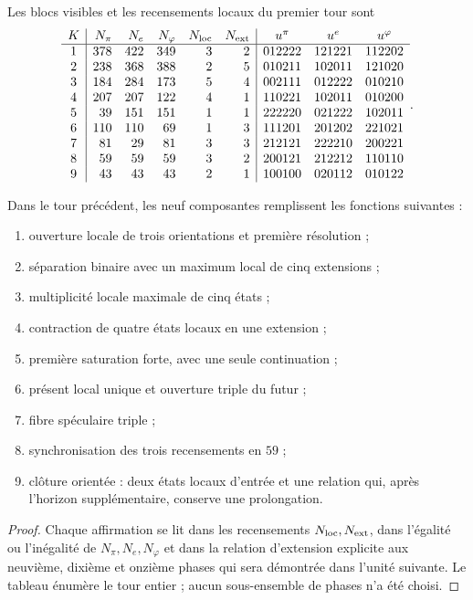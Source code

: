 Les blocs visibles et les recensements locaux du premier tour sont
\[
\begin{array}{c|rrrrr|ccc}
K&N_\pi&N_e&N_\varphi&N_{\rm loc}&N_{\rm ext}
 &u^\pi&u^e&u^\varphi\\\hline
1&378&422&349&3&2&012222&121221&112202\\
2&238&368&388&2&5&010211&102011&121020\\
3&184&284&173&5&4&002111&012222&010210\\
4&207&207&122&4&1&110221&102011&010200\\
5&39&151&151&1&1&222220&021222&102011\\
6&110&110&69&1&3&111201&201202&221021\\
7&81&29&81&3&3&212121&222210&200221\\
8&59&59&59&3&2&200121&212212&110110\\
9&43&43&43&2&1&100100&020112&010122
\end{array}.
\]

\begin{theorem}
\label{p12-83-c7-s1:thm:funciones-nueve-componentes}
Dans le tour précédent, les neuf composantes remplissent les fonctions
suivantes :
\begin{enumerate}
 \item ouverture locale de trois orientations et première résolution ;
 \item séparation binaire avec un maximum local de cinq extensions ;
 \item multiplicité locale maximale de cinq états ;
 \item contraction de quatre états locaux en une extension ;
 \item première saturation forte, avec une seule continuation ;
 \item présent local unique et ouverture triple du futur ;
 \item fibre spéculaire triple ;
 \item synchronisation des trois recensements en \(59\) ;
 \item clôture orientée : deux états locaux d'entrée et une relation qui,
       après l'horizon supplémentaire, conserve une prolongation.
\end{enumerate}
\end{theorem}

\begin{proof}
Chaque affirmation se lit dans les recensements \(N_{\rm loc},N_{\rm ext}\), dans
l'égalité ou l'inégalité de \(N_\pi,N_e,N_\varphi\) et dans la relation
d'extension explicite aux neuvième, dixième et onzième phases qui sera démontrée
dans l'unité suivante. Le tableau énumère le tour entier ; aucun
sous-ensemble de phases n'a été choisi.
\end{proof}

